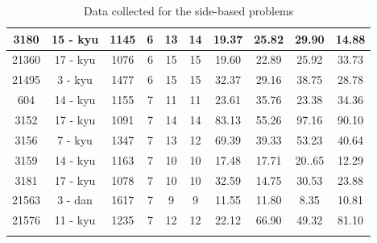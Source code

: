 \documentclass{l4proj}
\begin{document}
\begin{appendices}
\begin{longtable}{|c|c|c|c|c|c|c|c|c|c|}
3180 & 15 - kyu & 1145 & 6 & 13 & 14 & 19.37 & 25.82 & 29.90 & 14.88 \\ \hline
21360 & 17 - kyu & 1076 & 6 & 15 & 15 & 19.60 & 22.89 & 25.92 & 33.73 \\ \hline
21495 & 3 - kyu & 1477 & 6 & 15 & 15 & 32.37 & 29.16 & 38.75 & 28.78 \\ \hline
604 & 14 - kyu & 1155 & 7 & 11 & 11 & 23.61 & 35.76 & 23.38 & 34.36 \\ \hline
3152 & 17 - kyu & 1091 & 7 & 14 & 14 & 83.13 & 55.26 & 97.16 & 90.10 \\ \hline
3156 & 7 - kyu & 1347 & 7 & 13 & 12 & 69.39 & 39.33 & 53.23 & 40.64 \\ \hline
3159 & 14 - kyu & 1163 & 7 & 10 & 10 & 17.48 & 17.71 & 20..65 & 12.29 \\ \hline
3181 & 17 - kyu & 1078 & 7 & 10 & 10 & 32.59 & 14.75 & 30.53 & 23.88 \\ \hline
21563 & 3 - dan & 1617 & 7 & 9 & 9 & 11.55 & 11.80 & 8.35 & 10.81 \\ \hline
21576 & 11 - kyu & 1235 & 7 & 12 & 12 & 22.12 & 66.90 & 49.32 & 81.10 \\ \hline
\caption{ Data collected for the side-based problems}
\label{table:data-side}
\end{longtable}



\end{appendices}
\end{document}

